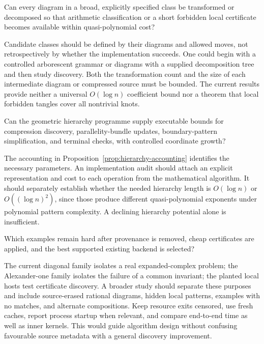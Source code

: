 \begin{researchquestion}
Can every diagram in a broad, explicitly specified class be transformed
or decomposed so that arithmetic classification or a short forbidden
local certificate becomes available within quasi-polynomial cost?
\end{researchquestion}
Candidate classes should be defined by their diagrams and allowed moves,
not retrospectively by whether the implementation succeeds.
One could begin with a controlled arborescent grammar or diagrams with
a supplied decomposition tree and then study discovery.
Both the transformation count and the size of each intermediate diagram
or compressed source must be bounded. The current results provide
neither a universal \(O(\log n)\) coefficient bound nor a theorem that
local forbidden tangles cover all nontrivial knots.

\begin{researchquestion}
Can the geometric hierarchy programme supply executable bounds for
compression discovery, parallelity-bundle updates, boundary-pattern
simplification, and terminal checks, with controlled coordinate growth?
\end{researchquestion}
The accounting in Proposition~\ref{prop:hierarchy-accounting} identifies
the necessary parameters. An implementation audit should attach an
explicit representation and cost to each operation from the mathematical
algorithm. It should separately establish whether the needed hierarchy
length is \(O(\log n)\) or \(O((\log n)^2)\), since those produce
different quasi-polynomial exponents under polynomial pattern complexity.
A declining hierarchy potential alone is insufficient.

\begin{researchquestion}
Which examples remain hard after provenance is removed, cheap certificates
are applied, and the best supported existing backend is selected?
\end{researchquestion}
The current diagonal family isolates a real expanded-complex problem;
the Alexander-one family isolates the failure of a common invariant;
the planted local hosts test certificate discovery. A broader study should
separate these purposes and include source-erased rational diagrams,
hidden local patterns, examples with no matches, and alternate compositions.
Keep resource exits censored, use fresh caches, report process startup
when relevant, and compare end-to-end time as well as inner kernels.
This would guide algorithm design without confusing favourable source
metadata with a general discovery improvement.

